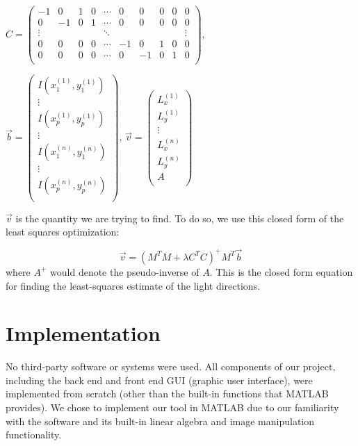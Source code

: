 \documentclass[10pt,twocolumn,letterpaper]{article}
\begin{document}
	
$C = 
	\begin{pmatrix}
	-1 & 0 & 1 & 0 & \cdots & 0 & 0 & 0 & 0 & 0\\
	0 & -1 & 0 & 1 & \cdots & 0 & 0 & 0 & 0 & 0\\
	\vdots & & & & \ddots & & & & & \vdots\\
	0 & 0 & 0 & 0 & \cdots & -1 & 0 & 1 & 0 & 0\\
	0 & 0 & 0 & 0 & \cdots & 0 & -1 & 0 & 1 & 0\\
	\end{pmatrix}$,
	
$\vec{b} =
	\begin{pmatrix}
	I(x^{(1)}_1,y^{(1)}_1)\\
	\vdots\\
	I(x^{(1)}_p,y^{(1)}_p)\\
	\vdots\\
	I(x^{(n)}_1,y^{(n)}_1)\\
	\vdots\\
	I(x^{(n)}_p,y^{(n)}_p)\\
	\end{pmatrix}$,
$\vec{v} = 
	\begin{pmatrix}
	L^{(1)}_x\\
	L^{(1)}_y\\
	\vdots\\
	L^{(n)}_x\\
	L^{(n)}_y\\
	A\\
	\end{pmatrix}$
	
$\vec{v}$ is the quantity we are trying to find. To do so, we use this closed form of the least squares optimization:

\[\vec{v} = (M^TM + \lambda C^TC)^+M^T\vec{b}\] where $A^+$ would denote the pseudo-inverse of $A$. This is the closed form equation for finding the least-squares estimate of the light directions.



\section{Implementation}

No third-party software or systems were used. All components of our project, including the back end and front end GUI (graphic user interface), were implemented from scratch (other than the built-in functions that MATLAB provides). We chose to implement our tool in MATLAB due to our familiarity with the software and its built-in linear algebra and image manipulation functionality.
\end{document}
